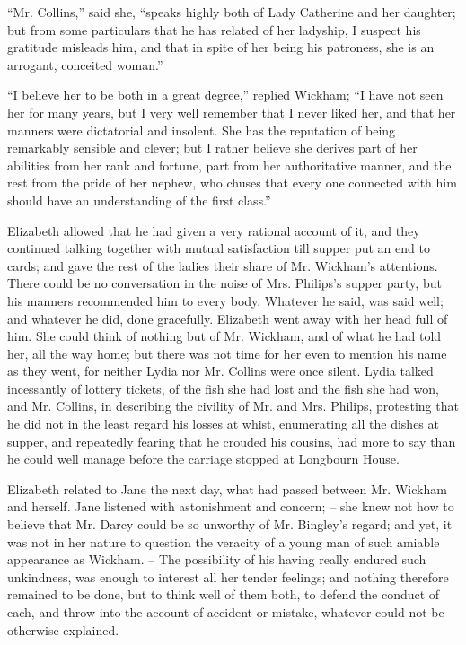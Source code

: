 “Mr. Collins,” said she, “speaks highly both of Lady
Catherine and her daughter; but from some particulars
that he has related of her ladyship, I suspect his gratitude
misleads him, and that in spite of her being his patroness,
she is an arrogant, conceited woman.”

“I believe her to be both in a great degree,” replied
Wickham; “I have not seen her for many years, but
I very well remember that I never liked her, and that
her manners were dictatorial and insolent. She has the
reputation of being remarkably sensible and clever; but
I rather believe she derives part of her abilities from her
rank and fortune, part from her authoritative manner,
and the rest from the pride of her nephew, who chuses
that every one connected with him should have an understanding
of the first class.”

Elizabeth allowed that he had given a very rational
account of it, and they continued talking together with
mutual satisfaction till supper put an end to cards; and
gave the rest of the ladies their share of Mr. Wickham’s
attentions. There could be no conversation in the noise
of Mrs. Philips’s supper party, but his manners recommended
him to every body. Whatever he said, was said
well; and whatever he did, done gracefully. Elizabeth
went away with her head full of him. She could think of
nothing but of Mr. Wickham, and of what he had told her,
all the way home; but there was not time for her even
to mention his name as they went, for neither Lydia nor
Mr. Collins were once silent. Lydia talked incessantly of
lottery tickets, of the fish she had lost and the fish she had
won, and Mr. Collins, in describing the civility of Mr. and
Mrs. Philips, protesting that he did not in the least regard
his losses at whist, enumerating all the dishes at supper,
and repeatedly fearing that he crouded his cousins, had
more to say than he could well manage before the carriage
stopped at Longbourn House.


Elizabeth related to Jane the next day, what had
passed between Mr. Wickham and herself. Jane listened
with astonishment and concern; -- she knew not how to
believe that Mr. Darcy could be so unworthy of Mr.
Bingley’s regard; and yet, it was not in her nature to
question the veracity of a young man of such amiable
appearance as Wickham. -- The possibility of his having
really endured such unkindness, was enough to interest
all her tender feelings; and nothing therefore remained
to be done, but to think well of them both, to defend the
conduct of each, and throw into the account of accident
or mistake, whatever could not be otherwise explained.

